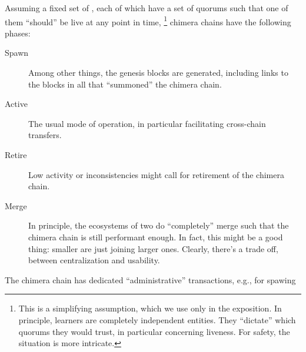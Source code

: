 Assuming a fixed set of \base[s], 
each of which have a set of quorums
such that one of them “should” be live at any point in time,%
\footnote{%
  This is a simplifying assumption,
  which we use only in the exposition.
  In principle,
  learners are completely independent entities.
  They “dictate” which quorums they would trust,  
  in particular concerning liveness.
  For safety, %
  the situation is more intricate. %
}%
\xspace%
chimera chains have the following phases:
\begin{description}
\item[Spawn] %
  Among other things,
  the genesis blocks are generated,
  including links to the blocks in all \base[s]
  that “summoned” the chimera chain. 

\item[Active]
  The usual mode of operation,
  in particular facilitating cross-chain transfers. 

\item[Retire] 
  Low activity or inconsistencies might call 
  for retirement of the chimera chain. 

\item[Merge]
  In principle,
  the ecosystems of two \base[s] do “completely” merge
  such that the chimera chain is still performant enough.
  In fact,
  this might be a good thing:
  smaller \base[s] are just joining larger ones.
  Clearly,
  there's a trade off,
  between centralization and usability. 
\end{description}

The chimera chain has dedicated “administrative” transactions,
e.g.,
for spawing










